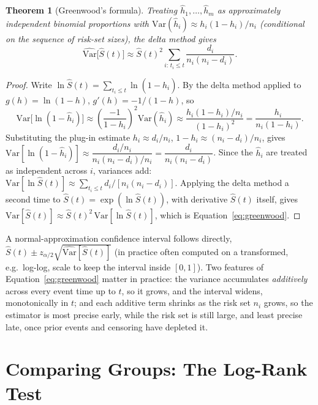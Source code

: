 \documentclass[11pt]{article}
\newtheorem{theorem}{Theorem}
\theoremstyle{remark}
\theoremstyle{definition}
\begin{document}
\begin{theorem}[Greenwood's formula]
\label{thm:greenwood}
Treating $\hat h_1,\ldots,\hat h_m$ as approximately independent binomial proportions with $\mathrm{Var}(\hat h_i)\approx h_i(1-h_i)/n_i$ (conditional on the sequence of risk-set sizes), the delta method gives
\begin{equation}
\widehat{\mathrm{Var}}\big[\hat S(t)\big] \approx \hat S(t)^2\sum_{i:\,t_i\le t}\frac{d_i}{n_i(n_i-d_i)}.
\label{eq:greenwood}
\end{equation}
\end{theorem}
\begin{proof}
Write $\ln\hat S(t) = \sum_{t_i\le t}\ln(1-\hat h_i)$. By the delta method applied to $g(h)=\ln(1-h)$, $g'(h)=-1/(1-h)$, so
\begin{equation*}
\mathrm{Var}\big[\ln(1-\hat h_i)\big] \approx \left(\frac{-1}{1-h_i}\right)^2\mathrm{Var}(\hat h_i) \approx \frac{h_i(1-h_i)/n_i}{(1-h_i)^2} = \frac{h_i}{n_i(1-h_i)}.
\end{equation*}
Substituting the plug-in estimate $h_i\approx d_i/n_i$, $1-h_i\approx (n_i-d_i)/n_i$, gives $\mathrm{Var}[\ln(1-\hat h_i)]\approx \dfrac{d_i/n_i}{n_i(n_i-d_i)/n_i} = \dfrac{d_i}{n_i(n_i-d_i)}$. Since the $\hat h_i$ are treated as independent across $i$, variances add: $\mathrm{Var}[\ln\hat S(t)]\approx\sum_{t_i\le t}d_i/[n_i(n_i-d_i)]$. Applying the delta method a second time to $\hat S(t)=\exp(\ln\hat S(t))$, with derivative $\hat S(t)$ itself, gives $\mathrm{Var}[\hat S(t)]\approx \hat S(t)^2\,\mathrm{Var}[\ln\hat S(t)]$, which is Equation~\eqref{eq:greenwood}.
\end{proof}

A normal-approximation confidence interval follows directly, $\hat S(t)\pm z_{\alpha/2}\sqrt{\widehat{\mathrm{Var}}[\hat S(t)]}$ (in practice often computed on a transformed, e.g.\ log-log, scale to keep the interval inside $[0,1]$). Two features of Equation~\eqref{eq:greenwood} matter in practice: the variance accumulates \emph{additively} across every event time up to $t$, so it grows, and the interval widens, monotonically in $t$; and each additive term shrinks as the risk set $n_i$ grows, so the estimator is most precise early, while the risk set is still large, and least precise late, once prior events and censoring have depleted it.

\section{Comparing Groups: The Log-Rank Test}
\label{sec:logrank}
\end{document}
